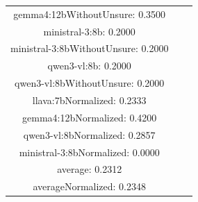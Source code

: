 \documentclass[a4paper]{article}
\begin{document}
\begin{tabular}{ccc}
gemma4:12bWithoutUnsure: 0.3500 \\ ministral-3:8b: 0.2000 \\ ministral-3:8bWithoutUnsure: 0.2000 \\ qwen3-vl:8b: 0.2000 \\ qwen3-vl:8bWithoutUnsure: 0.2000 \\ llava:7bNormalized: 0.2333 \\ gemma4:12bNormalized: 0.4200 \\ qwen3-vl:8bNormalized: 0.2857 \\ ministral-3:8bNormalized: 0.0000 \\ average: 0.2312 \\ averageNormalized: 0.2348 \end{minipage}\\
\end{tabular}

\vspace{5mm}
\end{document}
